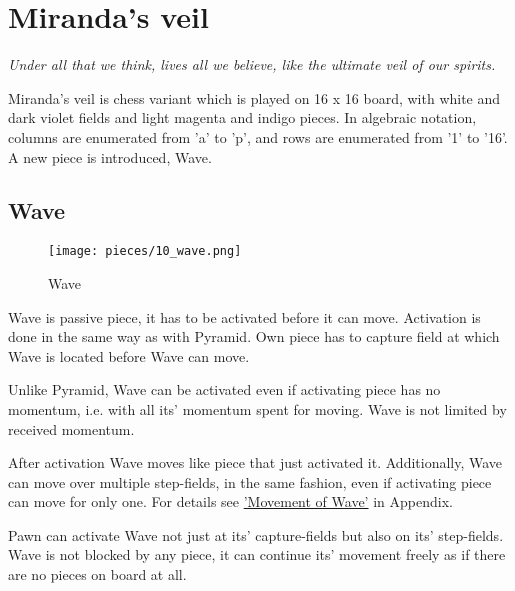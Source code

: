 
\chapter*{Miranda's veil}

\begin{flushright}
\parbox{0.8\textwidth}{
\emph{Under all that we think, lives all we believe, like the ultimate veil of our spirits. \\
 } }
\end{flushright}

\noindent
Miranda's veil is chess variant which is played on 16 x 16 board, with
white and dark violet fields and light magenta and indigo pieces. In
algebraic notation, columns are enumerated from 'a' to 'p', and rows
are enumerated from '1' to '16'. A new piece is introduced, Wave.

\clearpage %

\section*{Wave}

\noindent
\begin{wrapfigure}[12]{l}{0.4\textwidth}
\centering
\texttt{[image: pieces/10\_wave.png]}
\caption{Wave}
\label{fig:10_wave}
\end{wrapfigure}
Wave is passive piece, it has to be activated before it can move.
Activation is done in the same way as with Pyramid. Own piece
has to capture field at which Wave is located before Wave can
move.

Unlike Pyramid, Wave can be activated even if activating piece
has no momentum, i.e. with all its' momentum spent for moving.
Wave is not limited by received momentum.

After activation Wave moves like piece that just activated it.
Additionally, Wave can move over multiple step-fields, in the same
fashion, even if activating piece can move for only one. For details
see \hyperref[sec:Appendix/Movement of Wave]{'Movement of Wave'} in Appendix.

Pawn can activate Wave not just at its' capture-fields but also on its'
step-fields. Wave is not blocked by any piece, it can continue its'
movement freely as if there are no pieces on board at all.

